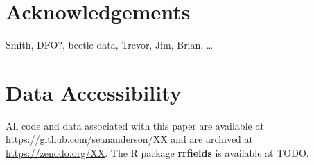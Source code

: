\documentclass[12pt,english]{article}
\begin{document}
\begin{spacing}{1.3}
%
%

\section{Acknowledgements}

Smith, DFO?, beetle data, Trevor, Jim, Brian, \ldots

\section{Data Accessibility}

All code and data associated with this paper are available at
\url{https://github.com/seananderson/XX} and are archived at
\url{https://zenodo.org/XX}.
The R package \textbf{rrfields} is available at TODO.


\end{spacing}
\end{document}

